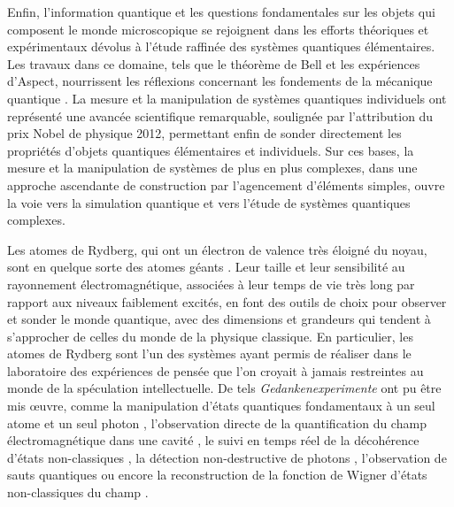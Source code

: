 Enfin, l'information quantique et les questions fondamentales sur les objets qui composent le monde microscopique se rejoignent dans les efforts théoriques et expérimentaux dévolus à l'étude raffinée des systèmes quantiques élémentaires.
Les travaux dans ce domaine, tels que le théorème de Bell et les expériences d'Aspect, nourrissent les réflexions concernant les fondements de la mécanique quantique \cite{QM_BELL64,QM_ASPECTGRANGIEREPR82,QM_ASPECTEPR82}.
La mesure et la manipulation de systèmes quantiques individuels ont représenté une avancée scientifique remarquable, soulignée par l'attribution du prix Nobel de physique 2012, permettant enfin de sonder directement les propriétés d'objets quantiques élémentaires et individuels.
Sur ces bases, la mesure et la manipulation de systèmes de plus en plus complexes, dans une approche ascendante de construction par l'agencement d'éléments simples, ouvre la voie vers la simulation quantique et vers l'étude de systèmes quantiques complexes.



\bigskip
Les atomes de Rydberg, qui ont un électron de valence très éloigné du noyau, sont en quelque sorte des \og atomes géants \fg{}. Leur taille et leur sensibilité au rayonnement électromagnétique, associées à leur temps de vie très long par rapport aux niveaux faiblement excités, en font des outils de choix pour observer et sonder le monde quantique, avec des dimensions et grandeurs qui tendent à s'approcher de celles du monde de la physique classique.
En particulier, les atomes de Rydberg sont l'un des systèmes ayant permis de réaliser dans le laboratoire des expériences de pensée que l'on croyait à jamais restreintes au monde de la spéculation intellectuelle.
De tels \textit{Gedankenexperimente} ont pu être mis \oe uvre, comme la manipulation d'états quantiques fondamentaux à un seul atome et un seul photon \cite{ENS_EXPTWOPHOTON},
l'observation directe de la quantification du champ électromagnétique dans une cavité \cite{ENS_QRABI},
le suivi en temps réel de la décohérence d'états non-classiques \cite{ENS_CAT,ENS_RMP},
la détection non-destructive de photons \cite{ENS_QND,ENS_COUNT05},
l'observation de sauts quantiques \cite{ENS_QNDZEROUN07,ENS_QNDCOLLAPSE07}
ou encore la reconstruction de la fonction de Wigner d'états non-classiques du champ \cite{ENS_FULLWIGNER08}.

